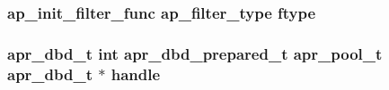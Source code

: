 \subsubsection[{\texorpdfstring{ftype}{ftype}}]{ {\bf ap\+\_\+init\+\_\+filter\+\_\+func} {\bf ap\+\_\+filter\+\_\+type} ftype}\hypertarget{group__APACHE__CORE__FILTER_gaeab66420f0bf5d08ac6c6604830fb243}{}\label{group__APACHE__CORE__FILTER_gaeab66420f0bf5d08ac6c6604830fb243}
\subsubsection[{\texorpdfstring{handle}{handle}}]{ {\bf apr\+\_\+dbd\+\_\+t} {\bf int} {\bf apr\+\_\+dbd\+\_\+prepared\+\_\+t} {\bf apr\+\_\+pool\+\_\+t} {\bf apr\+\_\+dbd\+\_\+t} $\ast$ handle}\hypertarget{group__APACHE__CORE__FILTER_ga68ba22c11aa974c2d027851747c98822}{}\label{group__APACHE__CORE__FILTER_ga68ba22c11aa974c2d027851747c98822}
